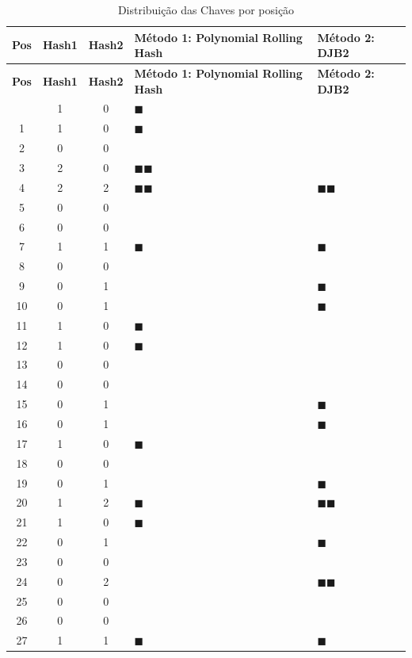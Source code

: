 \documentclass[12pt,a4paper]{abntex2}
\begin{document}
\begin{longtable}{|c|c|c|l|l|}
\caption{Distribuição das Chaves por posição} \\
\hline
\textbf{Pos} & \textbf{Hash1} & \textbf{Hash2} & \textbf{Método 1: Polynomial Rolling Hash} & \textbf{Método 2: DJB2} \\
\hline
\endfirsthead

\hline
\textbf{Pos} & \textbf{Hash1} & \textbf{Hash2} & \textbf{Método 1: Polynomial Rolling Hash} & \textbf{Método 2: DJB2} \\
\hline
\endhead

\hline
\endfoot
0  & 1 & 0 & $\blacksquare$ & \\
1  & 1 & 0 & $\blacksquare$ & \\
2  & 0 & 0 &   & \\
3  & 2 & 0 & $\blacksquare\blacksquare$ & \\
4  & 2 & 2 & $\blacksquare\blacksquare$ & $\blacksquare\blacksquare$ \\
5  & 0 & 0 &   & \\
6  & 0 & 0 &   & \\
7  & 1 & 1 & $\blacksquare$ & $\blacksquare$ \\
8  & 0 & 0 &   & \\
9  & 0 & 1 &   & $\blacksquare$ \\
10 & 0 & 1 &   & $\blacksquare$ \\
11 & 1 & 0 & $\blacksquare$ & \\
12 & 1 & 0 & $\blacksquare$ & \\
13 & 0 & 0 &   & \\
14 & 0 & 0 &   & \\
15 & 0 & 1 &   & $\blacksquare$ \\
16 & 0 & 1 &   & $\blacksquare$ \\
17 & 1 & 0 & $\blacksquare$ & \\
18 & 0 & 0 &   & \\
19 & 0 & 1 &   & $\blacksquare$ \\
20 & 1 & 2 & $\blacksquare$ & $\blacksquare\blacksquare$ \\
21 & 1 & 0 & $\blacksquare$ & \\
22 & 0 & 1 &   & $\blacksquare$ \\
23 & 0 & 0 &   & \\
24 & 0 & 2 &   & $\blacksquare\blacksquare$ \\
25 & 0 & 0 &   & \\
26 & 0 & 0 &   & \\
27 & 1 & 1 & $\blacksquare$ & $\blacksquare$ \\

\end{longtable}
\end{document}
